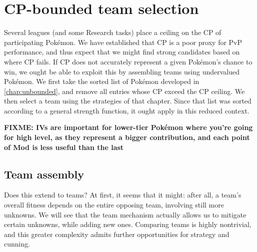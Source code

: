 \chapter{CP-bounded team selection}
\label{chap:bounded}
Several leagues (and some Research tasks) place a ceiling on the CP of
 participating Pokémon.
We have established that CP is a poor proxy for PvP performance, and thus
 expect that we might find strong candidates based on where CP fails.
If CP does not accurately represent a given Pokémon's chance to win, we ought
 be able to exploit this by assembling teams using undervalued Pokémon.
We first take the sorted list of Pokémon developed in \autoref{chap:unbounded},
 and remove all entries whose CP exceed the CP ceiling.
We then select a team using the strategies of that chapter. Since
 that list was sorted according to a general strength function, it
 ought apply in this reduced context.

\textbf{FIXME: IVs are important for lower-tier Pokémon where you're going for high level,
          as they represent a bigger contribution, and each point of Mod is less useful
          than the last}

\section{Team assembly}
Does this extend to teams?
At first, it seems that it might: after all, a team's overall fitness
 depends on the entire opposing team, involving still more unknowns.
We will see that the team mechanism actually allows us to mitigate certain
 unknowns, while adding new ones.
Comparing teams is highly nontrivial, and this greater complexity admits
 further opportunities for strategy and cunning.


